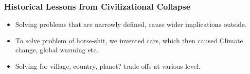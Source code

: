 \begin{frame}[fragile]\frametitle{Historical Lessons from Civilizational Collapse}
	\begin{itemize}
	\item Solving problems that are narrowly defined, cause wider implications outside.
	\item To solve problem of horse-shit, we invented cars, which then caused Climate change, global warming etc.
	\item Solving for village, country, planet? trade-offs at various level.
	\end{itemize}
\end{frame}






